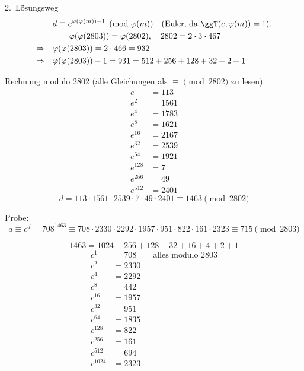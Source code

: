 \begin{loesung}
\begin{enumerate}[label=\alph*)]
  2.\ Lösungsweg
  \begin{align*}
  & d \equiv e^{\varphi(\varphi(m)) - 1} \pmod{\varphi(m)} \quad (\text{Euler, da } \ggT(e, \varphi(m)) = 1).\\
  & \qquad \varphi(\varphi(2803)) = \varphi(2802), \quad 2802 = 2 \cdot 3 \cdot 467\\
  \Rightarrow\quad & \varphi(\varphi(2803)) = 2 \cdot 466 = 932\\
  \Rightarrow\quad & \varphi(\varphi(2803)) - 1 = 931 = 512 + 256 + 128 + 32 + 2 + 1
  \end{align*}
\end{enumerate}

Rechnung modulo 2802 (alle Gleichungen als $\equiv \pmod{2802}$ zu lesen)
\begin{align*}
e &= 113\\
e^2 &= 1561\\
e^4 &= 1783\\
e^8 &= 1621\\
e^{16} &= 2167\\
e^{32} &= 2539\\
e^{64} &= 1921\\
e^{128} &= 7\\
e^{256} &= 49\\
e^{512} &= 2401
\end{align*}
\[
d = 113 \cdot 1561 \cdot 2539 \cdot 7 \cdot 49 \cdot 2401 \equiv 1463 \pmod{2802}
\]

\medskip
Probe:
\[
a \equiv c^d = 708^{1463} \equiv 708 \cdot 2330 \cdot 2292 \cdot 1957 \cdot 951 \cdot 822 \cdot 161 \cdot 2323 \equiv 715 \pmod{2803}
\]

\[
1463 = 1024 + 256 + 128 + 32 + 16 + 4 + 2 + 1
\]
\begin{align*}
c^1 &= 708 \qquad \text{alles modulo } 2803\\
c^2 &= 2330\\
c^4 &= 2292\\
c^8 &= 442\\
c^{16} &= 1957\\
c^{32} &= 951\\
c^{64} &= 1835\\
c^{128} &= 822\\
c^{256} &= 161\\
c^{512} &= 694\\
c^{1024} &= 2323
\end{align*}
\end{loesung}
